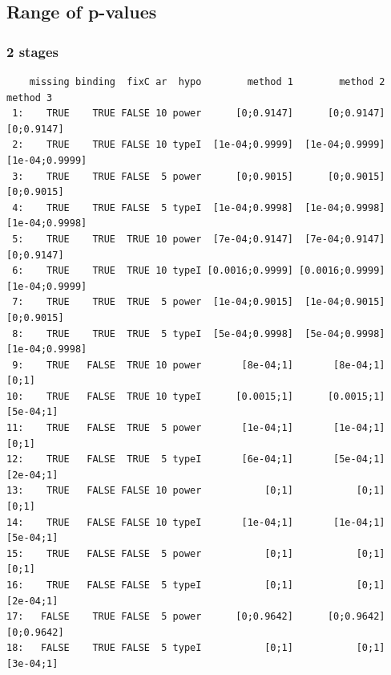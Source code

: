 \documentclass[12pt]{article}
\begin{document}
\subsection{Range of p-values}
\label{sec:orgcb7167a}

\subsubsection{2 stages}
\label{sec:orga37518c}
\begin{verbatim}
    missing binding  fixC ar  hypo        method 1        method 2       method 3
 1:    TRUE    TRUE FALSE 10 power      [0;0.9147]      [0;0.9147]     [0;0.9147]
 2:    TRUE    TRUE FALSE 10 typeI  [1e-04;0.9999]  [1e-04;0.9999] [1e-04;0.9999]
 3:    TRUE    TRUE FALSE  5 power      [0;0.9015]      [0;0.9015]     [0;0.9015]
 4:    TRUE    TRUE FALSE  5 typeI  [1e-04;0.9998]  [1e-04;0.9998] [1e-04;0.9998]
 5:    TRUE    TRUE  TRUE 10 power  [7e-04;0.9147]  [7e-04;0.9147]     [0;0.9147]
 6:    TRUE    TRUE  TRUE 10 typeI [0.0016;0.9999] [0.0016;0.9999] [1e-04;0.9999]
 7:    TRUE    TRUE  TRUE  5 power  [1e-04;0.9015]  [1e-04;0.9015]     [0;0.9015]
 8:    TRUE    TRUE  TRUE  5 typeI  [5e-04;0.9998]  [5e-04;0.9998] [1e-04;0.9998]
 9:    TRUE   FALSE  TRUE 10 power       [8e-04;1]       [8e-04;1]          [0;1]
10:    TRUE   FALSE  TRUE 10 typeI      [0.0015;1]      [0.0015;1]      [5e-04;1]
11:    TRUE   FALSE  TRUE  5 power       [1e-04;1]       [1e-04;1]          [0;1]
12:    TRUE   FALSE  TRUE  5 typeI       [6e-04;1]       [5e-04;1]      [2e-04;1]
13:    TRUE   FALSE FALSE 10 power           [0;1]           [0;1]          [0;1]
14:    TRUE   FALSE FALSE 10 typeI       [1e-04;1]       [1e-04;1]      [5e-04;1]
15:    TRUE   FALSE FALSE  5 power           [0;1]           [0;1]          [0;1]
16:    TRUE   FALSE FALSE  5 typeI           [0;1]           [0;1]      [2e-04;1]
17:   FALSE    TRUE FALSE  5 power      [0;0.9642]      [0;0.9642]     [0;0.9642]
18:   FALSE    TRUE FALSE  5 typeI           [0;1]           [0;1]      [3e-04;1]
\end{verbatim}

\clearpage
\end{document}
